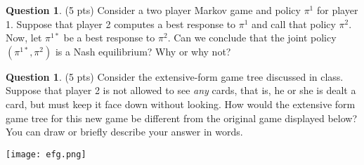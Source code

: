 \documentclass{article}
\theoremstyle{definition}
\newtheorem{question}[thm]{Question}
\begin{document}
\begin{question} (5 pts)
    Consider a two player Markov game and policy $\pi^1$ for player 1. Suppose that player 2 computes a best response to $\pi^1$ and call that policy $\pi^2$. Now, let $\pi^{1*}$ be a best response to $\pi^2$. Can we conclude that the joint policy $(\pi^{1*}, \pi^{2})$ is a Nash equilibrium? Why or why not?
\end{question}

\begin{question} (5 pts)
    Consider the extensive-form game tree discussed in class. Suppose that player 2 is not allowed to see \emph{any} cards, that is, he or she is dealt a card, but must keep it face down without looking. How would the extensive form game tree for this new game be different from the original game displayed below? You can draw or briefly describe your answer in words.

    \vspace{1em}
    \texttt{[image: efg.png]}
\end{question}
\end{document}
